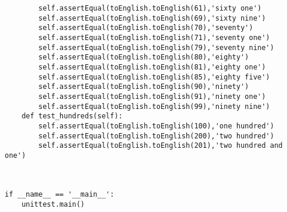 \documentclass{paper}
\begin{document}
\begin{lstlisting}
        self.assertEqual(toEnglish.toEnglish(61),'sixty one')
        self.assertEqual(toEnglish.toEnglish(69),'sixty nine')
        self.assertEqual(toEnglish.toEnglish(70),'seventy')
        self.assertEqual(toEnglish.toEnglish(71),'seventy one')
        self.assertEqual(toEnglish.toEnglish(79),'seventy nine')
        self.assertEqual(toEnglish.toEnglish(80),'eighty')
        self.assertEqual(toEnglish.toEnglish(81),'eighty one')
        self.assertEqual(toEnglish.toEnglish(85),'eighty five')
        self.assertEqual(toEnglish.toEnglish(90),'ninety')
        self.assertEqual(toEnglish.toEnglish(91),'ninety one')
        self.assertEqual(toEnglish.toEnglish(99),'ninety nine')
    def test_hundreds(self):
        self.assertEqual(toEnglish.toEnglish(100),'one hundred')
        self.assertEqual(toEnglish.toEnglish(200),'two hundred')
        self.assertEqual(toEnglish.toEnglish(201),'two hundred and one')
        
      

if __name__ == '__main__':
    unittest.main()


\end{lstlisting}
\end{document}
